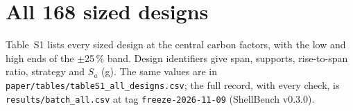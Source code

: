 \documentclass[11pt,a4paper]{article}
\begin{document}
\section{All 168 sized designs}

Table~S1 lists every sized design at the central carbon factors, with the low and high ends of the $\pm$25\,\% band. Design identifiers give span, supports, rise-to-span ratio, strategy and $S_a$ (g). The same values are in \texttt{paper/tables/tableS1\_all\_designs.csv}; the full record, with every check, is \texttt{results/batch\_all.csv} at tag \texttt{freeze-2026-11-09} (ShellBench v0.3.0).

\begin{center}

\end{center}
\end{document}
